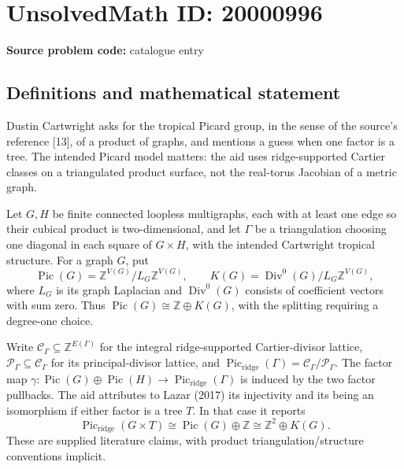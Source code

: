 \documentclass[11pt]{article}
\newcommand{\Z}{\mathbb{Z}}
\begin{document}
\section*{UnsolvedMath ID: 20000996}
\textbf{Source problem code:} catalogue entry
\subsection{Definitions and mathematical statement}
Dustin Cartwright asks for the tropical Picard group, in the sense of the source's reference [13], of a product of graphs, and mentions a guess when one factor is a tree. The intended Picard model matters: the aid uses ridge-supported Cartier classes on a triangulated product surface, not the real-torus Jacobian of a metric graph.

Let $G,H$ be finite connected loopless multigraphs, each with at least one edge so their cubical product is two-dimensional, and let $\Gamma$ be a triangulation choosing one diagonal in each square of $G\times H$, with the intended Cartwright tropical structure. For a graph $G$, put
\[
 \operatorname{Pic}(G)=\Z^{V(G)}/L_G\Z^{V(G)},\qquad
 K(G)=\operatorname{Div}^0(G)/L_G\Z^{V(G)},
\]
where $L_G$ is its graph Laplacian and $\operatorname{Div}^0(G)$ consists of coefficient vectors with sum zero. Thus $\operatorname{Pic}(G)\cong\Z\oplus K(G)$, with the splitting requiring a degree-one choice.

Write $\mathcal C_\Gamma\subseteq\Z^{E(\Gamma)}$ for the integral ridge-supported Cartier-divisor lattice, $\mathcal P_\Gamma\subseteq\mathcal C_\Gamma$ for its principal-divisor lattice, and
$\operatorname{Pic}_{\mathrm{ridge}}(\Gamma)=\mathcal C_\Gamma/\mathcal P_\Gamma$.
The factor map $\gamma:\operatorname{Pic}(G)\oplus\operatorname{Pic}(H)\to\operatorname{Pic}_{\mathrm{ridge}}(\Gamma)$ is induced by the two factor pullbacks. The aid attributes to Lazar (2017) its injectivity and its being an isomorphism if either factor is a tree $T$. In that case it reports
\[
 \operatorname{Pic}_{\mathrm{ridge}}(G\times T)
 \cong\operatorname{Pic}(G)\oplus\Z
 \cong\Z^2\oplus K(G).
\]
These are supplied literature claims, with product triangulation/structure conventions implicit.
\end{document}
